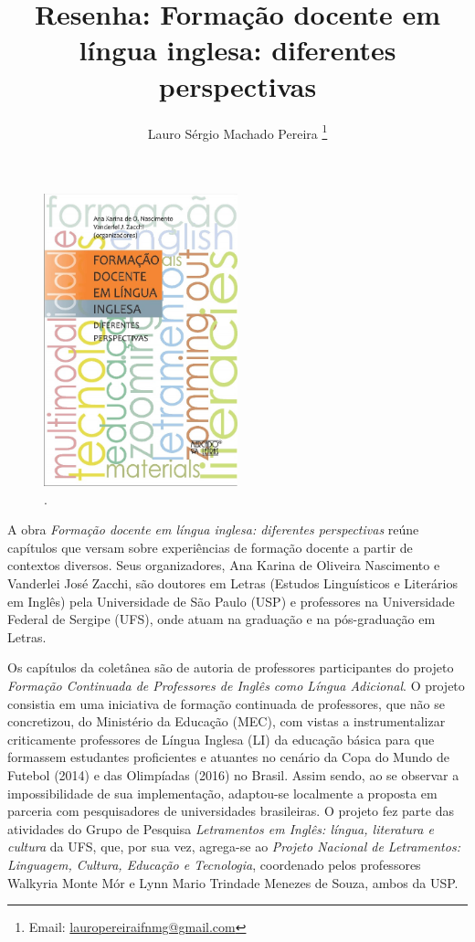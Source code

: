 \documentclass[portuguese]{textolivre}
\title{Resenha: Formação docente em língua inglesa: diferentes perspectivas}
\author[1]{Lauro Sérgio Machado Pereira \orcid{0000-0002-7144-2733} \thanks{Email: \href{mailto:lauropereiraifnmg@gmail.com}{lauropereiraifnmg@gmail.com}}}
\affil[1]{Instituto Federal do Norte de Minas Gerais, Janaúba, MG, Brasil.}
\begin{document}
\maketitle


\begin{figure}[htbp]
 \centering
 \includegraphics[width=0.5\textwidth]{Fig1.png}
 \caption*{.}
 \label{fig01}
\end{figure}


A obra \textit{Formação docente em língua inglesa: diferentes perspectivas} reúne capítulos que versam sobre experiências de formação docente a partir de contextos diversos. Seus organizadores, Ana Karina de Oliveira Nascimento e Vanderlei José Zacchi, são doutores em Letras (Estudos Linguísticos e Literários em Inglês) pela Universidade de São Paulo (USP) e professores na Universidade Federal de Sergipe (UFS), onde atuam na graduação e na pós-graduação em Letras.

Os capítulos da coletânea são de autoria de professores participantes do projeto \textit{Formação Continuada de Professores de Inglês como Língua Adicional}. O projeto consistia em uma iniciativa de formação continuada de professores, que não se concretizou, do Ministério da Educação (MEC), com vistas a instrumentalizar criticamente professores de Língua Inglesa (LI) da educação básica para que formassem estudantes proficientes e atuantes no cenário da Copa do Mundo de Futebol (2014) e das Olimpíadas (2016) no Brasil. Assim sendo, ao se observar a impossibilidade de sua implementação, adaptou-se localmente a proposta em parceria com pesquisadores de universidades brasileiras. O projeto fez parte das atividades do Grupo de Pesquisa \textit{Letramentos em Inglês: língua, literatura e cultura} da UFS, que, por sua vez, agrega-se ao \textit{Projeto Nacional de Letramentos: Linguagem, Cultura, Educação e Tecnologia}, coordenado pelos professores Walkyria Monte Mór e Lynn Mario Trindade Menezes de Souza, ambos da USP. 
\end{document}
